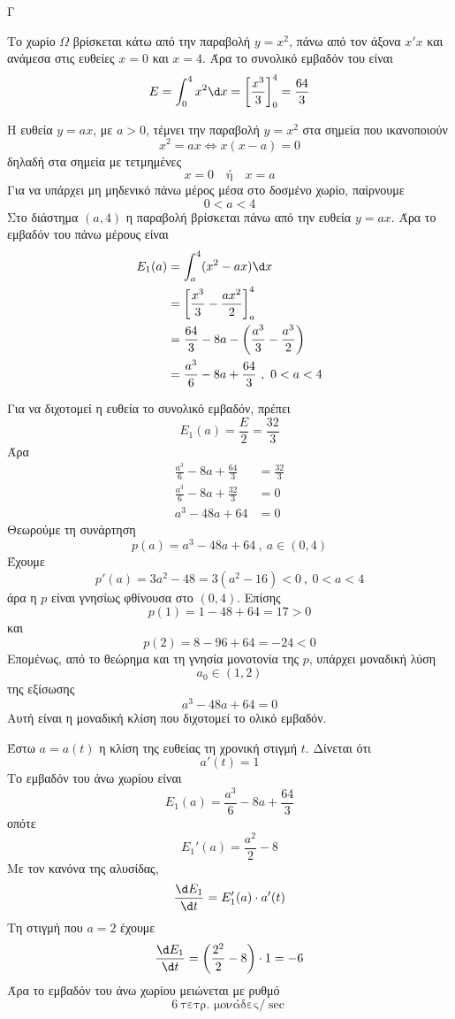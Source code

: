 
\begin{thema}{Γ}
\begin{erwthma}
\item Το χωρίο $\Omega$ βρίσκεται κάτω από την παραβολή $y=x^2$, πάνω από τον άξονα $x'x$ και ανάμεσα στις ευθείες $x=0$ και $x=4$.
Άρα το συνολικό εμβαδόν του είναι
\[E=\dint_0^4 x^2\d x=\left[\frac{x^3}{3}\right]_0^4=\frac{64}{3}\]

\item Η ευθεία $y=ax$, με $a>0$, τέμνει την παραβολή $y=x^2$ στα σημεία που ικανοποιούν
\[x^2=ax\Leftrightarrow x(x-a)=0\]
δηλαδή στα σημεία με τετμημένες
\[x=0\quad\text{ή}\quad x=a\]
Για να υπάρχει μη μηδενικό πάνω μέρος μέσα στο δοσμένο χωρίο, παίρνουμε
\[0<a<4\]
Στο διάστημα $(a,4)$ η παραβολή βρίσκεται πάνω από την ευθεία $y=ax$.
Άρα το εμβαδόν του πάνω μέρους είναι
\begin{align*}
E_1(a)&=\dint_a^4 (x^2-ax)\d x\\
&=\left[\frac{x^3}{3}-\frac{ax^2}{2}\right]_a^4\\
&=\frac{64}{3}-8a-\left(\frac{a^3}{3}-\frac{a^3}{2}\right)\\
&=\frac{a^3}{6}-8a+\frac{64}{3}\ ,\ 0<a<4
\end{align*}

\item Για να διχοτομεί η ευθεία το συνολικό εμβαδόν, πρέπει
\[E_1(a)=\frac{E}{2}=\frac{32}{3}\]
Άρα
\begin{align*}
\frac{a^3}{6}-8a+\frac{64}{3}&=\frac{32}{3}\\
\frac{a^3}{6}-8a+\frac{32}{3}&=0\\
a^3-48a+64&=0
\end{align*}
Θεωρούμε τη συνάρτηση
\[p(a)=a^3-48a+64\ ,\ a\in(0,4)\]
Έχουμε
\[p'(a)=3a^2-48=3(a^2-16)<0\ ,\ 0<a<4\]
άρα η $p$ είναι γνησίως φθίνουσα στο $(0,4)$.
Επίσης
\[p(1)=1-48+64=17>0\]
και
\[p(2)=8-96+64=-24<0\]
Επομένως, από το θεώρημα  και τη γνησία μονοτονία της $p$, υπάρχει μοναδική λύση
\[a_0\in(1,2)\]
της εξίσωσης
\[a^3-48a+64=0\]
Αυτή είναι η μοναδική κλίση που διχοτομεί το ολικό εμβαδόν.

\item Έστω $a=a(t)$ η κλίση της ευθείας τη χρονική στιγμή $t$.
Δίνεται ότι
\[a'(t)=1\]
Το εμβαδόν του άνω χωρίου είναι
\[E_1(a)=\frac{a^3}{6}-8a+\frac{64}{3}\]
οπότε
\[E_1'(a)=\frac{a^2}{2}-8\]
Με τον κανόνα της αλυσίδας,
\[\frac{\d E_1}{\d t}=E_1'(a)\cdot a'(t)\]
Τη στιγμή που $a=2$ έχουμε
\[\frac{\d E_1}{\d t}=\left(\frac{2^2}{2}-8\right)\cdot1=-6\]
Άρα το εμβαδόν του άνω χωρίου μειώνεται με ρυθμό
\[6\ \text{τετρ. μονάδες}/\sec\]
\end{erwthma}
\end{thema}

